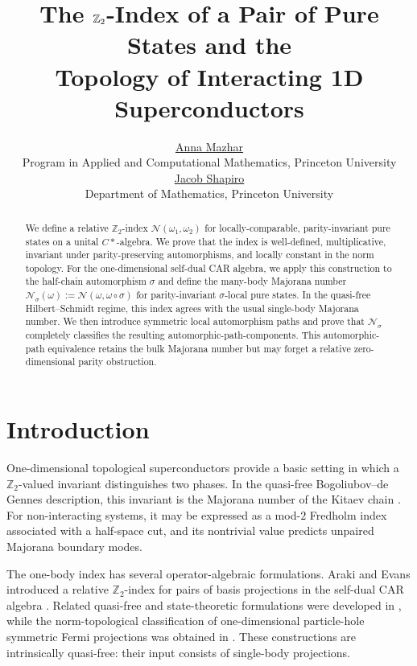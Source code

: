 \documentclass[a4paper,10pt]{article}
\title{The $\ZZ_2$-Index of a Pair of Pure States and the\\Topology of Interacting 1D Superconductors}
\author{\href{mailto:am1864@princeton.edu}{Anna Mazhar}\\
	{\footnotesize Program in Applied and Computational Mathematics, Princeton University }\\
	\href{mailto:jacobshapiro@princeton.edu}{Jacob Shapiro}\\
	{\footnotesize Department of Mathematics, Princeton University}
}
\makeatletter
\newcommand{\reqnomode}{\tagsleft@false\let\veqno\@@eqno}
\numberwithin{equation}{section}
\theoremstyle{plain}
\theoremstyle{plain}
\theoremstyle{plain}
\theoremstyle{plain}
\theoremstyle{plain}
\theoremstyle{remark}
\theoremstyle{definition}
\newcommand{\ZZ}{\mathbb{Z}}
\newcommand{\calN}{\mathcal{N}}
\newcommand{\Cstar}{C*}
\makeatother
\begin{document}
\reqnomode
\maketitle
\begin{abstract}
We define a relative $\ZZ_2$-index $\calN(\omega_1,\omega_2)$ for locally-comparable, parity-invariant pure states on a unital $\Cstar$-algebra. We prove that the index is well-defined, multiplicative, invariant under parity-preserving automorphisms, and locally constant in the norm topology. For the one-dimensional self-dual CAR algebra, we apply this construction to the half-chain automorphism $\sigma$ and define the many-body Majorana number
$\calN_\sigma(\omega):=\calN(\omega,\omega\circ\sigma)$
for parity-invariant $\sigma$-local pure states. In the quasi-free Hilbert--Schmidt regime, this index agrees with the usual single-body Majorana number. We then introduce symmetric local automorphism paths and prove that $\calN_\sigma$ completely classifies the resulting automorphic-path-components. This automorphic-path equivalence retains the bulk Majorana number but may forget a relative zero-dimensional parity obstruction.
\end{abstract}
\tableofcontents
\section{Introduction}\label{sec:introduction}

One-dimensional topological superconductors provide a basic setting in which a $\ZZ_2$-valued invariant distinguishes two phases. In the quasi-free Bogoliubov--de Gennes description, this invariant is the Majorana number of the Kitaev chain \cite{Kitaev2001Majorana}. For non-interacting systems, it may be expressed as a mod-$2$ Fredholm index associated with a half-space cut, and its nontrivial value predicts unpaired Majorana boundary modes.

The one-body index has several operator-algebraic formulations. Araki and Evans introduced a relative $\ZZ_2$-index for pairs of basis projections in the self-dual CAR algebra \cite{ArakiEvans1983Ising}. Related quasi-free and state-theoretic formulations were developed in \cite{AzaReyesLegaSequera2022QuasiFree,AzaMussnichReyesLega2022StateIndex}, while the norm-topological classification of one-dimensional particle-hole symmetric Fermi projections was obtained in \cite{ChungShapiro2023}. These constructions are intrinsically quasi-free: their input consists of single-body projections.
\end{document}
